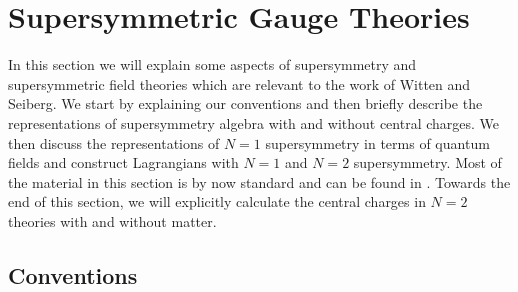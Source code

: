 \section{Supersymmetric Gauge Theories}

In this section we will explain some aspects of supersymmetry and
supersymmetric field theories which are relevant to the work of Witten
and Seiberg. We start by explaining our conventions and then briefly
describe the representations of supersymmetry algebra with and without
central charges. We then discuss the representations of $N=1$
supersymmetry in terms of quantum fields and construct Lagrangians
with $N=1$ and $N=2$ supersymmetry. Most of the material in this
section is by now standard and can be found in \cite{WB,West,Sohnius}. 
Towards the end of this section, we will explicitly calculate the
central charges in $N=2$ theories with and without matter.
\subsection{Conventions}

